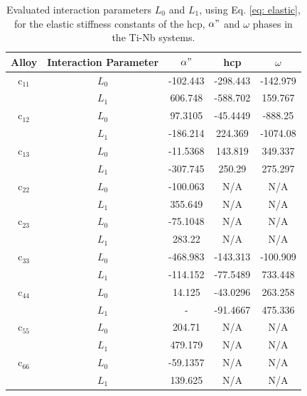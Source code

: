 \newpage
\newpage
\begin{table}[H]
	\caption{Evaluated interaction parameters $L_0$ and $L_1$, using Eq. \ref{eq: elastic}, for the elastic stiffness constants of the hcp, $\alpha"$ and $\omega$ phases in the Ti-Nb systems.}
	\centering
	\begin{tabular}{ c c c c c }
		\hline
		Alloy & Interaction Parameter & $\alpha"$ & hcp & $\omega$\\
		\hline
		c$_{11}$ & $L_{0}$ & -102.443 & -298.443 & -142.979 \\
		& $L_{1}$ & 606.748 & -588.702 & 159.767 \\
		c$_{12}$ & $L_{0}$ & 97.3105 & -45.4449 & -888.25 \\
		& $L_{1}$ & -186.214 & 224.369 & -1074.08 \\
		c$_{13}$ & $L_{0}$ & -11.5368 & 143.819 & 349.337 \\
		& $L_{1}$ & -307.745 & 250.29 & 275.297 \\
		c$_{22}$ & $L_{0}$ & -100.063 & N/A & N/A \\
		& $L_{1}$ & 355.649 & N/A & N/A \\
		c$_{23}$ & $L_{0}$ & -75.1048 & N/A & N/A \\
		& $L_{1}$ & 283.22 & N/A & N/A \\
		c$_{33}$ & $L_{0}$ & -468.983 & -143.313 & -100.909 \\
		& $L_{1}$ & -114.152 & -77.5489 & 733.448 \\
		c$_{44}$ & $L_{0}$ & 14.125 & -43.0296 & 263.258 \\
		& $L_{1}$ & - & -91.4667 & 475.336 \\
		c$_{55}$ & $L_{0}$ & 204.71 & N/A & N/A \\
		& $L_{1}$ & 479.179 & N/A & N/A \\
		c$_{66}$ & $L_{0}$ & -59.1357 & N/A & N/A \\
		& $L_{1}$ & 139.625 & N/A & N/A \\
		\hline
	\end{tabular}
	\label{Ch7-table:intpara}
\end{table}
\clearpage

